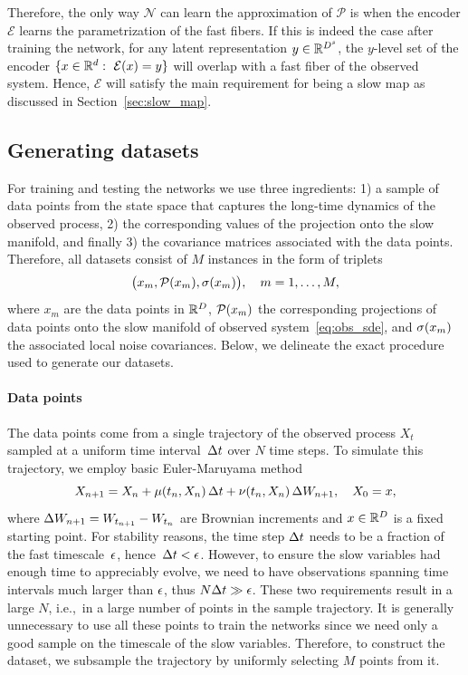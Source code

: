 \documentclass{article}
\newcommand{\enc}{\mathcal{E}} %
\newcommand{\net}{\mathcal{N}} %
\newcommand{\proj}{\mathcal{P}} %
\begin{document}
Therefore, the only way $\net$ can learn the approximation of $\proj$ is when the encoder $\enc$ learns the parametrization of the fast fibers. If this is indeed the case after training the network, for any latent representation $y\in\mathbb{R}^{D^s}$, the $y$-level set of the encoder $\{x\in\R^d:\ \enc(x)=y\}$ will overlap with a fast fiber of the observed system. Hence, $\enc$ will satisfy the main requirement for being a slow map as discussed in Section~\ref{sec:slow_map}.

\subsection{Generating datasets}\label{sec:dataset}
For training and testing the networks we use three ingredients: 1) a sample of data points from the state space that captures the long-time dynamics of the observed process, 2) the corresponding values of the projection onto the slow manifold, and finally 3) the covariance matrices associated with the data points. Therefore, all datasets consist of $M$ instances in the form of triplets
\begin{equation*}
    \big(x_m, \mathcal{P}(x_m), \sigma(x_m)\big),\quad m=1,\dotsc,M,
\end{equation*}
where $x_m$ are the data points in $\mathbb{R}^D$, $\mathcal{P}(x_m)$ the corresponding projections of data points onto the slow manifold of observed system~\eqref{eq:obs_sde}, and $\sigma(x_m)$ the associated local noise covariances. Below, we delineate the exact procedure used to generate our datasets.

\paragraph{Data points}
The data points come from a single trajectory of the observed process $X_t$ sampled at a uniform time interval~$\Delta t$ over $N$ time steps. To simulate this trajectory, we employ basic Euler-Maruyama method
\begin{equation}\label{eq:em}
    X_{n+1} = X_n + \mu(t_n, X_n)\,\Delta t + \nu(t_n,X_n)\,\Delta W_{n+1},\quad X_0 = x,
\end{equation}
where $\Delta W_{n+1} = W_{t_{n+1}} - W_{t_n}$ are Brownian increments and $x\in\mathbb{R}^D$ is a fixed starting point. For stability reasons,
the time step $\Delta t$ needs to be a fraction of the fast timescale~$\epsilon$, hence~$\Delta t < \epsilon$. However, to ensure the slow variables had enough time to appreciably evolve, we need to have observations spanning time intervals much larger than $\epsilon$, thus $N\Delta t \gg \epsilon$. These two requirements result in a large $N$, i.e.,~in a large number of points in the sample trajectory. It is generally unnecessary to use all these points to train the networks since we need only a good sample on the timescale of the slow variables. Therefore, to construct the dataset, we subsample the trajectory by uniformly selecting $M$ points from it.
\end{document}
